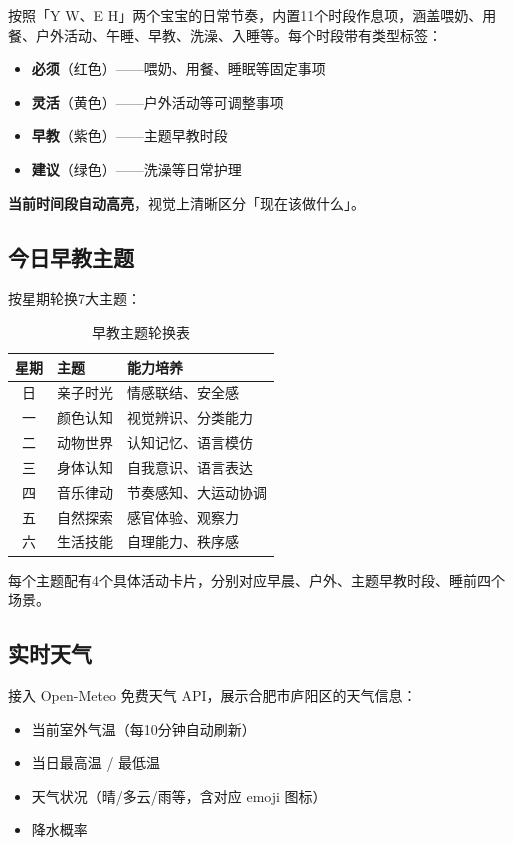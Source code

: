 \documentclass[12pt,a4paper,fontset=fandol]{ctexart}
\begin{document}
按照「Y W、E H」两个宝宝的日常节奏，内置11个时段作息项，涵盖喂奶、用餐、户外活动、午睡、早教、洗澡、入睡等。每个时段带有类型标签：

\begin{itemize}
    \item \textbf{必须}（红色）——喂奶、用餐、睡眠等固定事项
    \item \textbf{灵活}（黄色）——户外活动等可调整事项
    \item \textbf{早教}（紫色）——主题早教时段
    \item \textbf{建议}（绿色）——洗澡等日常护理
\end{itemize}

\textbf{当前时间段自动高亮}，视觉上清晰区分「现在该做什么」。

\subsection{今日早教主题}

按星期轮换7大主题：

\begin{table}[htbp]
\centering
\begin{tabular}{cll}
\toprule
\textbf{星期} & \textbf{主题} & \textbf{能力培养} \\
\midrule
日 & 亲子时光 & 情感联结、安全感 \\
一 & 颜色认知 & 视觉辨识、分类能力 \\
二 & 动物世界 & 认知记忆、语言模仿 \\
三 & 身体认知 & 自我意识、语言表达 \\
四 & 音乐律动 & 节奏感知、大运动协调 \\
五 & 自然探索 & 感官体验、观察力 \\
六 & 生活技能 & 自理能力、秩序感 \\
\bottomrule
\end{tabular}
\caption{早教主题轮换表}
\end{table}

每个主题配有4个具体活动卡片，分别对应早晨、户外、主题早教时段、睡前四个场景。

\subsection{实时天气}

接入 Open-Meteo 免费天气 API，展示合肥市庐阳区的天气信息：

\begin{itemize}
    \item 当前室外气温（每10分钟自动刷新）
    \item 当日最高温 / 最低温
    \item 天气状况（晴/多云/雨等，含对应 emoji 图标）
    \item 降水概率
\end{itemize}
\end{document}
